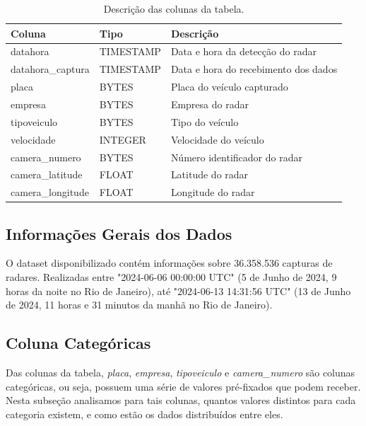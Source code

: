 \documentclass{article}
\begin{document}
\begin{table}
\centering
\begin{tabular}{|l|l|l|}
\hline
Coluna           & Tipo       & Descrição                                 \\\hline
datahora         & TIMESTAMP  & Data e hora da detecção do radar          \\\hline
datahora\_captura & TIMESTAMP  & Data e hora do recebimento dos dados      \\\hline
placa            & BYTES      & Placa do veículo capturado                \\\hline
empresa          & BYTES      & Empresa do radar                          \\\hline
tipoveiculo      & BYTES      & Tipo do veículo                           \\\hline
velocidade       & INTEGER    & Velocidade do veículo                     \\\hline
camera\_numero    & BYTES      & Número identificador do radar             \\\hline
camera\_latitude  & FLOAT      & Latitude do radar                         \\\hline
camera\_longitude & FLOAT      & Longitude do radar                        \\\hline
\end{tabular}
\caption{\label{tab:description}Descrição das colunas da tabela.}
\end{table}

\subsection{Informações Gerais dos Dados}
O dataset disponibilizado contém informações sobre 36.358.536 capturas de radares. Realizadas entre "2024-06-06 00:00:00 UTC" (5 de Junho de 2024, 9 horas da noite no Rio de Janeiro), até "2024-06-13 14:31:56 UTC" (13 de Junho de 2024, 11 horas e 31 minutos da manhã no Rio de Janeiro).


\subsection{Coluna Categóricas}
Das colunas da tabela, \textit{placa}, \textit{empresa}, \textit{tipoveiculo} e \textit{camera\_numero} são colunas categóricas, ou seja, possuem uma série de valores pré-fixados que podem receber. Nesta subseção analisamos para tais colunas, quantos valores distintos para cada categoria existem, e como estão os dados distribuídos entre eles.
\end{document}
